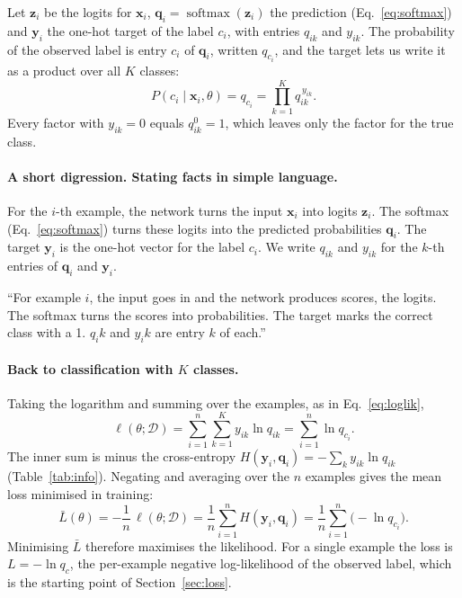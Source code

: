 \documentclass[12pt]{article}
\numberwithin{equation}{section} %
\newcommand{\softmax}{\operatorname{softmax}}
\newcommand{\vc}[1]{\symbf{#1}}
\begin{document}
Let $\vc{z}_i$ be the logits for $\vc{x}_i$, $\vc{q}_i=\softmax(\vc{z}_i)$ the
prediction (Eq.~\eqref{eq:softmax}) and $\vc{y}_i$ the one-hot target of the label
$c_i$, with entries $q_{ik}$ and $y_{ik}$. The probability of the observed label is
entry $c_i$ of $\vc{q}_i$, written $q_{c_i}$, and the target lets us write it as a
product over all $K$ classes:
\begin{equation}\label{eq:catlik}
  P(c_i\mid\vc{x}_i,\theta)=q_{c_i}=\prod_{k=1}^{K}q_{ik}^{\,y_{ik}} .
\end{equation}
Every factor with $y_{ik}=0$ equals $q_{ik}^{0}=1$, which leaves only the factor
for the true class.

\paragraph{A short digression. Stating facts in simple language.}
For the $i$-th example, the network turns the
input $\vc{x}_i$ into logits $\vc{z}_i$.
The softmax (Eq.~\eqref{eq:softmax}) turns
these logits into the predicted probabilities
$\vc{q}_i$. The target $\vc{y}_i$ is the one-hot
vector for the label $c_i$. We write $q_{ik}$
and $y_{ik}$ for the $k$-th entries of
$\vc{q}_i$ and $\vc{y}_i$.

``For example $i$, the input goes in and the network
produces scores, the logits. The softmax turns the
scores into probabilities. The target marks the
correct class with a 1. $q_ik$ and $y_ik$ are entry
$k$ of each.''

\paragraph{Back to classification with $K$ classes.}
Taking the logarithm and summing over the examples, as in
Eq.~\eqref{eq:loglik},
\begin{equation}\label{eq:condloglik}
  \ell(\theta;\mathcal{D})=\sum_{i=1}^{n}\sum_{k=1}^{K}y_{ik}\ln q_{ik}
    =\sum_{i=1}^{n}\ln q_{c_i}.
\end{equation}
The inner sum is minus the cross-entropy
$H(\vc{y}_i,\vc{q}_i)=-\sum_k y_{ik}\ln q_{ik}$ (Table~\ref{tab:info}). Negating
and averaging over the $n$ examples gives the mean loss minimised in training:
\begin{equation}\label{eq:meanloss}
  \bar L(\theta)=-\frac{1}{n}\,\ell(\theta;\mathcal{D})
    =\frac{1}{n}\sum_{i=1}^{n}H(\vc{y}_i,\vc{q}_i)
    =\frac{1}{n}\sum_{i=1}^{n}\bigl(-\ln q_{c_i}\bigr).
\end{equation}
Minimising $\bar L$ therefore maximises the likelihood. For a single example the
loss is $L=-\ln q_c$, the per-example negative log-likelihood of the observed
label, which is the starting point of Section~\ref{sec:loss}.
\end{document}
